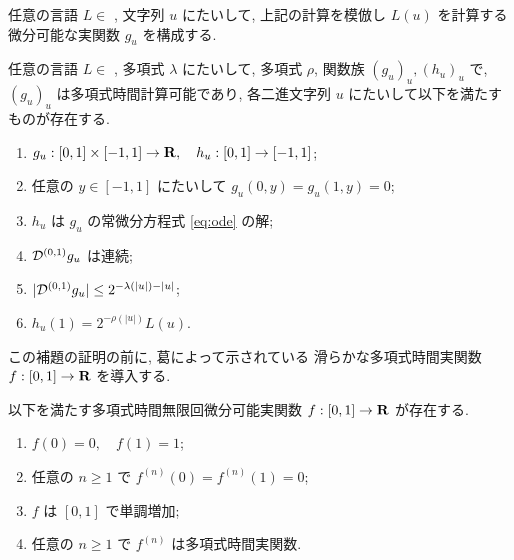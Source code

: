 任意の言語 $L \in $ \PSPACE, 文字列 $u$ にたいして,
上記の計算を模倣し $L(u)$ を計算する微分可能な実関数 $g_u$ を構成する.

\begin{lemma}
 \label{DifferentiableFamily}
 任意の言語 $L \in $ \PSPACE, 多項式 $\lambda$ にたいして,
 多項式 $\rho$, 関数族 $(g_u)_u, (h_u)_u$ で, 
 $(g_u)_u$ は多項式時間計算可能であり,
 各二進文字列 $u$ にたいして以下を満たすものが存在する.
 \begin{enumerate}
  \item $g_u:[0,1] \times [-1,1]\to \mathbf R, \quad h_u: [0,1] \to [-1,1]$;
  \item 任意の $y \in [-1,1]$ にたいして $g_u(0,y) = g_u(1,y) = 0 $; 
  \item $h_u$ は $g_u$ の常微分方程式 \ref{eq:ode} の解; 
  \item $\mathcal D^{(0,1)} g_u$ は連続;
  \item $|\mathcal D^{(0,1)} g_u| \leq 2^{-\lambda(|u|) - |u| } $;
  \item $h_u(1) = 2^{-\rho(|u|)}L(u)$.
 \end{enumerate}
\end{lemma}

 この補題の証明の前に, 葛によって示されている
 滑らかな多項式時間実関数 $f : [0,1] \to \mathbf R$ を導入する.
 
 \begin{lemma}
  \label{SmoothFunction}
  以下を満たす多項式時間無限回微分可能実関数 $f : [0,1] \to \mathbf R$ が存在する.
  \begin{enumerate}
   \item $f(0) = 0, \quad f(1) = 1$;
   \item 任意の $n \ge 1$ で $f^{(n)}(0) = f^{(n)}(1) = 0$;
   \item $f$ は $[0,1]$ で単調増加;
   \item 任意の $n \ge 1$ で $f^{(n)}$ は多項式時間実関数.
  \end{enumerate}
 \end{lemma} 

